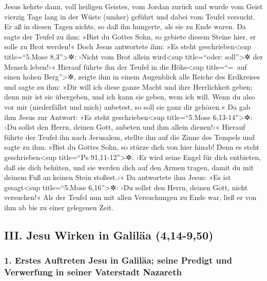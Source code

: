  Jesus kehrte dann, voll heiligen Geistes, vom Jordan
zurück und wurde vom Geist vierzig Tage lang in der Wüste (umher)
geführt  und dabei vom Teufel versucht. Er aß in diesen
Tagen nichts, so daß ihn hungerte, als sie zu Ende waren. 
Da sagte der Teufel zu ihm: »Bist du Gottes Sohn, so gebiete diesem
Steine hier, er solle zu Brot werden!«  Doch Jesus
antwortete ihm: »Es steht geschrieben\textless sup title=``5.Mose
8,3''\textgreater✲: ›Nicht vom Brot allein wird\textless sup
title=``oder: soll''\textgreater✲ der Mensch leben!‹« 
Hierauf führte ihn der Teufel in die Höhe\textless sup title=``=~auf
einen hohen Berg''\textgreater✲, zeigte ihm in einem Augenblick alle
Reiche des Erdkreises  und sagte zu ihm: »Dir will ich
diese ganze Macht und ihre Herrlichkeit geben; denn mir ist sie
übergeben, und ich kann sie geben, wem ich will.  Wenn du
also vor mir (niederfällst und mich) anbetest, so soll sie ganz dir
gehören.«  Da gab ihm Jesus zur Antwort: »Es steht
geschrieben\textless sup title=``5.Mose 6,13-14''\textgreater✲: ›Du
sollst den Herrn, deinen Gott, anbeten und ihm allein dienen!‹«
 Hierauf führte der Teufel ihn nach Jerusalem, stellte ihn
auf die Zinne des Tempels und sagte zu ihm: »Bist du Gottes Sohn, so
stürze dich von hier hinab!  Denn es steht
geschrieben\textless sup title=``Ps 91,11-12''\textgreater✲: ›Er wird
seine Engel für dich entbieten, daß sie dich behüten, 
und sie werden dich auf den Armen tragen, damit du mit deinem Fuß an
keinen Stein stoßest.‹«  Da antwortete ihm Jesus: »Es ist
gesagt\textless sup title=``5.Mose 6,16''\textgreater✲: ›Du sollst den
Herrn, deinen Gott, nicht versuchen!«  Als der Teufel nun
mit allen Versuchungen zu Ende war, ließ er von ihm ab bis zu einer
gelegenen Zeit.

\hypertarget{iii.-jesu-wirken-in-galiluxe4a-414-950}{%
\subsection{III. Jesu Wirken in Galiläa
(4,14-9,50)}\label{iii.-jesu-wirken-in-galiluxe4a-414-950}}

\hypertarget{erstes-auftreten-jesu-in-galiluxe4a-seine-predigt-und-verwerfung-in-seiner-vaterstadt-nazareth}{%
\subsubsection{1. Erstes Auftreten Jesu in Galiläa; seine Predigt und
Verwerfung in seiner Vaterstadt
Nazareth}\label{erstes-auftreten-jesu-in-galiluxe4a-seine-predigt-und-verwerfung-in-seiner-vaterstadt-nazareth}}

